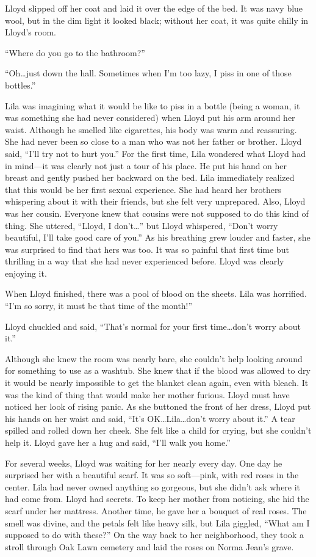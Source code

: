 \documentclass[
  american,
  letterpaper,
]{book}
\begin{document}
Lloyd slipped off her coat and laid it over the edge of the bed. It was
navy blue wool, but in the dim light it looked black; without her coat,
it was quite chilly in Lloyd's room.

``Where do you go to the bathroom?''

``Oh\ldots just down the hall. Sometimes when I'm too lazy, I piss in
one of those bottles.''

Lila was imagining what it would be like to piss in a bottle (being a
woman, it was something she had never considered) when Lloyd put his arm
around her waist. Although he smelled like cigarettes, his body was warm
and reassuring. She had never been so close to a man who was not her
father or brother. Lloyd said, ``I'll try not to hurt you.'' For the
first time, Lila wondered what Lloyd had in mind---it was clearly not
just a tour of his place. He put his hand on her breast and gently
pushed her backward on the bed. Lila immediately realized that this
would be her first sexual experience. She had heard her brothers
whispering about it with their friends, but she felt very unprepared.
Also, Lloyd was her cousin. Everyone knew that cousins were not supposed
to do this kind of thing. She uttered, ``Lloyd, I don't\ldots{}'' but
Lloyd whispered, ``Don't worry beautiful, I'll take good care of you.''
As his breathing grew louder and faster, she was surprised to find that
hers was too. It was so painful that first time but thrilling in a way
that she had never experienced before. Lloyd was clearly enjoying it.

When Lloyd finished, there was a pool of blood on the sheets. Lila was
horrified. ``I'm so sorry, it must be that time of the month!''

Lloyd chuckled and said, ``That's normal for your first time\ldots don't
worry about it.''

Although she knew the room was nearly bare, she couldn't help looking
around for something to use as a washtub. She knew that if the blood was
allowed to dry it would be nearly impossible to get the blanket clean
again, even with bleach. It was the kind of thing that would make her
mother furious. Lloyd must have noticed her look of rising panic. As she
buttoned the front of her dress, Lloyd put his hands on her waist and
said, ``It's OK\ldots Lila\ldots don't worry about it.'' A tear spilled
and rolled down her cheek. She felt like a child for crying, but she
couldn't help it. Lloyd gave her a hug and said, ``I'll walk you home.''

For several weeks, Lloyd was waiting for her nearly every day. One day
he surprised her with a beautiful scarf. It was so soft---pink, with red
roses in the center. Lila had never owned anything so gorgeous, but she
didn't ask where it had come from. Lloyd had secrets. To keep her mother
from noticing, she hid the scarf under her mattress. Another time, he
gave her a bouquet of real roses. The smell was divine, and the petals
felt like heavy silk, but Lila giggled, ``What am I supposed to do with
these?'' On the way back to her neighborhood, they took a stroll through
Oak Lawn cemetery and laid the roses on Norma Jean's grave.
\end{document}
